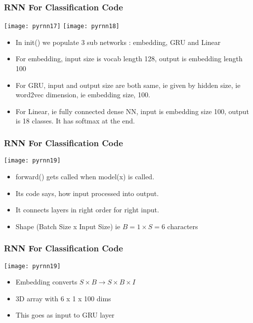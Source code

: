 \begin{frame}[fragile] \frametitle{RNN For Classification Code}
\begin{center}
\texttt{[image: pyrnn17]}
\texttt{[image: pyrnn18]}
\end{center}
\begin{itemize}
\item In init() we populate 3 sub networks : embedding, GRU and Linear
\item For embedding, input size is vocab length 128, output is embedding length 100
\item For GRU, input and output size are both same, ie given by hidden size, ie word2vec dimension, ie embedding size, 100.
\item For Linear, ie fully connected dense NN, input is embedding size 100, output is 18 classes. It has softmax at the end.
\end{itemize}

\end{frame}

\begin{frame}[fragile] \frametitle{RNN For Classification Code}
\begin{center}
\texttt{[image: pyrnn19]}
\end{center}
\begin{itemize}
\item forward() gets called when model(x) is called.
\item Its code says, how input processed into output. 
\item It connects layers in right order for right input. 
\item Shape (Batch Size x Input Size) ie $B=1 \times S=6$ characters
\end{itemize}

\end{frame}


\begin{frame}[fragile] \frametitle{RNN For Classification Code}
\begin{center}
\texttt{[image: pyrnn19]}
\end{center}
\begin{itemize}
\item Embedding converts $S \times B \rightarrow S \times B \times I $
\item 3D array with 6 x 1 x 100 dims
\item This goes as input to GRU layer
\end{itemize}
\end{frame}


